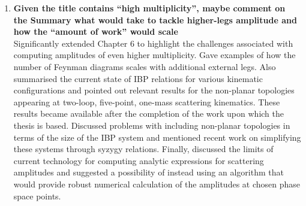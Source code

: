 \documentclass[main.tex]{subfiles}
\begin{document}
\begin{enumerate}
\item \textbf{Given the title contains “high multiplicity”, maybe comment on the Summary what
would take to tackle higher-legs amplitude and how the “amount of work” would
scale} \\
Significantly extended Chapter 6 to highlight the challenges associated with computing amplitudes of even higher multiplicity. Gave examples of how the number of Feynman diagrams scales with additional external legs. Also summarised the current state of IBP relations for various kinematic configurations and pointed out relevant results for the non-planar topologies appearing at two-loop, five-point, one-mass scattering kinematics. These results became available after the completion of the work upon which the thesis is based. Discussed problems with including non-planar topologies in terms of the size of the IBP system and mentioned recent work on simplifying these systems through syzygy relations. Finally, discussed the limits of current technology for computing analytic expressions for scattering amplitudes and suggested a possibility of instead using an algorithm that would provide robust numerical calculation of the amplitudes at chosen phase space points.

\end{enumerate}
\end{document}
